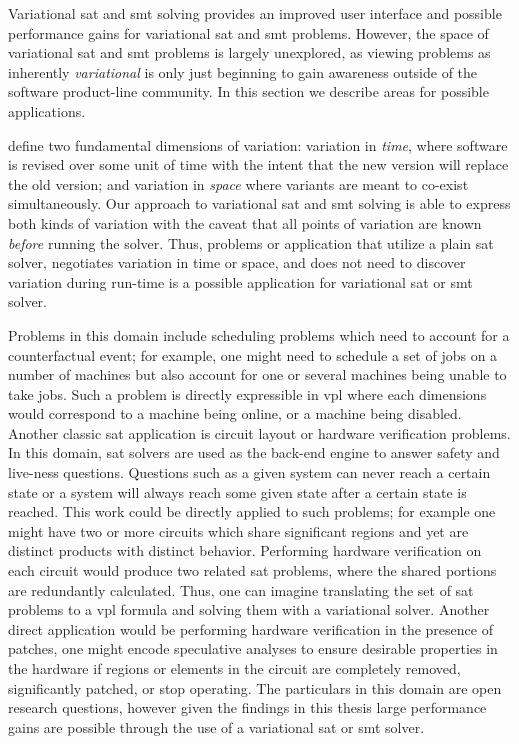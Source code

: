 \label{section:conclusion:applications}
%
Variational \ac{sat} and \ac{smt} solving provides an improved user interface
and possible performance gains for variational \ac{sat} and \ac{smt} problems.
However, the space of variational \ac{sat} and \ac{smt} problems is largely
unexplored, as viewing problems as inherently \emph{variational} is only just
beginning to gain awareness outside of the software product-line community. In
this section we describe areas for possible applications.

\citet{TTS+:VariVolution19} define two fundamental dimensions of variation:
variation in \emph{time}, where software is revised over some unit of time with
the intent that the new version will replace the old version; and variation in
\emph{space} where variants are meant to co-exist simultaneously. Our approach
to variational \ac{sat} and \ac{smt} solving is able to express both kinds of
variation with the caveat that all points of variation are known \emph{before}
running the solver. Thus, problems or application that utilize a plain \ac{sat}
solver, negotiates variation in time or space, and does not need to discover
variation during run-time is a possible application for variational \ac{sat} or
\ac{smt} solver.

Problems in this domain include scheduling problems which need to account for a
counterfactual event; for example, one might need to schedule a set of jobs on a
number of machines but also account for one or several machines being unable to
take jobs. Such a problem is directly expressible in \ac{vpl} where each
dimensions would correspond to a machine being online, or a machine being
disabled. Another classic \ac{sat} application is circuit layout or
hardware verification problems. In this domain, \ac{sat} solvers are used as the
back-end engine to answer safety and live-ness questions. Questions such as a
given system can never reach a certain state or a system will always reach some
given state after a certain state is reached. This work could be directly
applied to such problems; for example one might have two or more circuits which
share significant regions and yet are distinct products with distinct behavior.
Performing hardware verification on each circuit would produce two related
\ac{sat} problems, where the shared portions are redundantly calculated. Thus,
one can imagine translating the set of \ac{sat} problems to a \ac{vpl} formula
and solving them with a variational solver. Another direct application would be
performing hardware verification in the presence of patches, one might encode
speculative analyses to ensure desirable properties in the hardware if regions
or elements in the circuit are completely removed, significantly patched, or
stop operating. The particulars in this domain are open research questions,
however given the findings in this thesis large performance gains are possible
through the use of a variational \ac{sat} or \ac{smt} solver.

